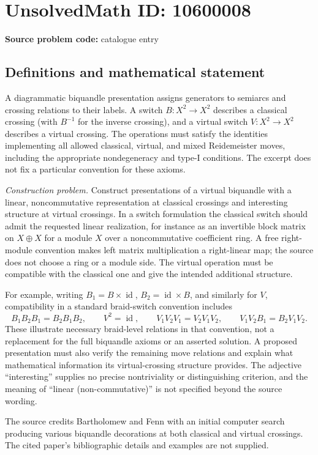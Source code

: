 \documentclass[11pt]{article}
\begin{document}
\section*{UnsolvedMath ID: 10600008}
\textbf{Source problem code:} catalogue entry
\subsection{Definitions and mathematical statement}
A diagrammatic biquandle presentation assigns generators to semiarcs and crossing relations to their labels. A switch \(B:X^2\to X^2\) describes a classical crossing (with \(B^{-1}\) for the inverse crossing), and a virtual switch \(V:X^2\to X^2\) describes a virtual crossing. The operations must satisfy the identities implementing all allowed classical, virtual, and mixed Reidemeister moves, including the appropriate nondegeneracy and type-I conditions. The excerpt does not fix a particular convention for these axioms.

\emph{Construction problem.} Construct presentations of a virtual biquandle with a linear, noncommutative representation at classical crossings and interesting structure at virtual crossings. In a switch formulation the classical switch should admit the requested linear realization, for instance as an invertible block matrix on \(X\oplus X\) for a module \(X\) over a noncommutative coefficient ring. A free right-module convention makes left matrix multiplication a right-linear map; the source does not choose a ring or a module side. The virtual operation must be compatible with the classical one and give the intended additional structure.

For example, writing \(B_1=B\times\operatorname{id}\), \(B_2=\operatorname{id}\times B\), and similarly for \(V\), compatibility in a standard braid-switch convention includes
\[
 B_1B_2B_1=B_2B_1B_2,\qquad
 V^2=\operatorname{id},\qquad
 V_1V_2V_1=V_2V_1V_2,\qquad
 V_1V_2B_1=B_2V_1V_2.
\]
These illustrate necessary braid-level relations in that convention, not a replacement for the full biquandle axioms or an asserted solution. A proposed presentation must also verify the remaining move relations and explain what mathematical information its virtual-crossing structure provides. The adjective ``interesting'' supplies no precise nontriviality or distinguishing criterion, and the meaning of ``linear (non-commutative)'' is not specified beyond the source wording.

The source credits Bartholomew and Fenn with an initial computer search producing various biquandle decorations at both classical and virtual crossings. The cited paper's bibliographic details and examples are not supplied.
\end{document}
